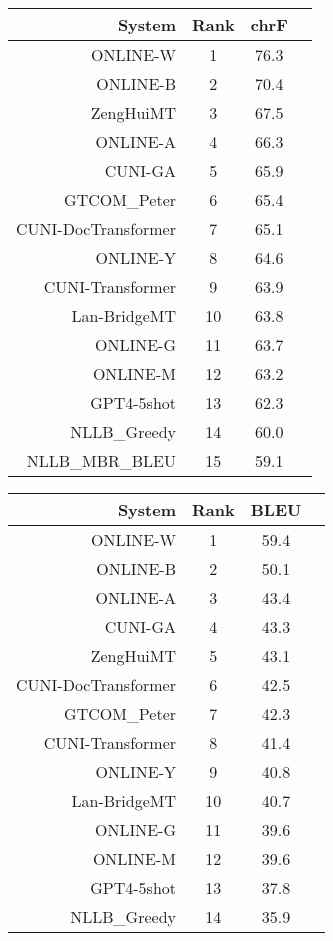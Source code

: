 \documentclass[11pt]{article}
\begin{document}
\begin{table}  
\scriptsize\begin{subtable}[t]{0.33\textwidth}
\begin{tabular}{rccc}
\toprule 
System & Rank & chrF \\ 
\midrule 
ONLINE-W & 1 & 76.3 \\ 
ONLINE-B & 2 & 70.4 \\ 
ZengHuiMT & 3 & 67.5 \\ 
ONLINE-A & 4 & 66.3 \\ 
CUNI-GA & 5 & 65.9 \\ 
GTCOM\_Peter & 6 & 65.4 \\ 
CUNI-DocTransformer & 7 & 65.1 \\ 
ONLINE-Y & 8 & 64.6 \\ 
CUNI-Transformer & 9 & 63.9 \\ 
Lan-BridgeMT & 10 & 63.8 \\ 
ONLINE-G & 11 & 63.7 \\ 
ONLINE-M & 12 & 63.2 \\ 
GPT4-5shot & 13 & 62.3 \\ 
NLLB\_Greedy & 14 & 60.0 \\ 
NLLB\_MBR\_BLEU & 15 & 59.1 \\ 
\bottomrule 
\end{tabular} 
\end{subtable} 
\begin{subtable}[t]{0.33\textwidth}
\begin{tabular}{rccc}
\toprule 
System & Rank & BLEU \\ 
\midrule 
ONLINE-W & 1 & 59.4 \\ 
ONLINE-B & 2 & 50.1 \\ 
ONLINE-A & 3 & 43.4 \\ 
CUNI-GA & 4 & 43.3 \\ 
ZengHuiMT & 5 & 43.1 \\ 
CUNI-DocTransformer & 6 & 42.5 \\ 
GTCOM\_Peter & 7 & 42.3 \\ 
CUNI-Transformer & 8 & 41.4 \\ 
ONLINE-Y & 9 & 40.8 \\ 
Lan-BridgeMT & 10 & 40.7 \\ 
ONLINE-G & 11 & 39.6 \\ 
ONLINE-M & 12 & 39.6 \\ 
GPT4-5shot & 13 & 37.8 \\ 
NLLB\_Greedy & 14 & 35.9 \\ 

\end{tabular}
\end{subtable}
\end{table}
\end{document}

